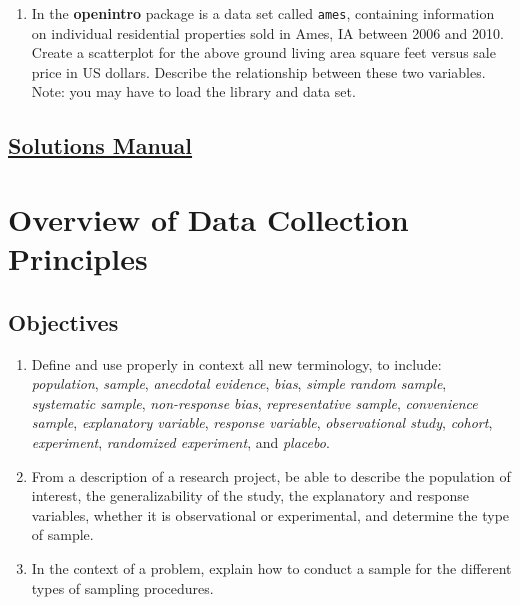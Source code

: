 \documentclass[
  letterpaper,
  DIV=11,
  numbers=noendperiod]{scrreprt}
\providecommand{\tightlist}{%
  \setlength{\itemsep}{0pt}\setlength{\parskip}{0pt}}\usepackage{longtable,booktabs,array}
\begin{document}
\begin{enumerate}
\def\labelenumi{\arabic{enumi}.}
\setcounter{enumi}{1}
\tightlist
\item
  In the \textbf{openintro} package is a data set called \texttt{ames},
  containing information on individual residential properties sold in
  Ames, IA between 2006 and 2010. Create a scatterplot for the above
  ground living area square feet versus sale price in US dollars.
  Describe the relationship between these two variables. Note: you may
  have to load the library and data set.
\end{enumerate}

\section*{\texorpdfstring{\href{https://ds-usafa.github.io/CPS-Solutions-Manual/DB.html}{Solutions
Manual}}{Solutions Manual}}\label{solutions-manual-2}


\chapter{Overview of Data Collection Principles}\label{ODCP}

\section{Objectives}\label{objectives-3}

\begin{enumerate}
\def\labelenumi{\arabic{enumi})}
\item
  Define and use properly in context all new terminology, to include:
  \emph{population}, \emph{sample}, \emph{anecdotal evidence},
  \emph{bias}, \emph{simple random sample}, \emph{systematic sample},
  \emph{non-response bias}, \emph{representative sample},
  \emph{convenience sample}, \emph{explanatory variable}, \emph{response
  variable}, \emph{observational study}, \emph{cohort},
  \emph{experiment}, \emph{randomized experiment}, and \emph{placebo}.
\item
  From a description of a research project, be able to describe the
  population of interest, the generalizability of the study, the
  explanatory and response variables, whether it is observational or
  experimental, and determine the type of sample.
\item
  In the context of a problem, explain how to conduct a sample for the
  different types of sampling procedures.
\end{enumerate}
\end{document}
